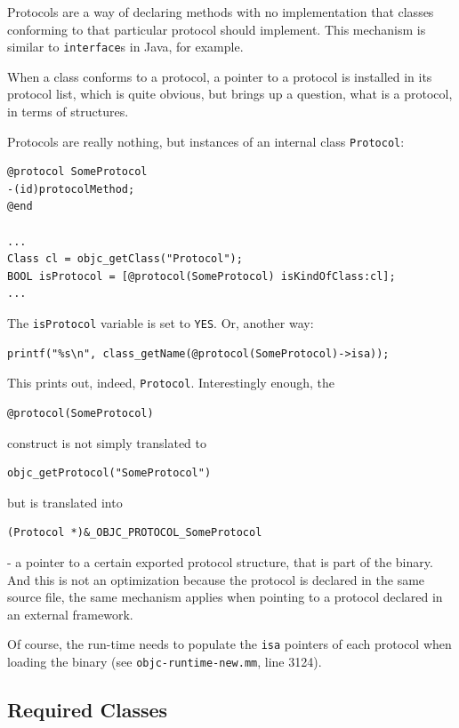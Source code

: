 Protocols are a way of declaring methods with no implementation that classes conforming to that particular protocol should implement. This mechanism is similar to \verb=interface=s in Java, for example.

When a class conforms to a protocol, a pointer to a protocol is installed in its protocol list, which is quite obvious, but brings up a question, what is a protocol, in terms of structures.

Protocols are really nothing, but instances of an internal class \verb=Protocol=:

\begin{verbatim}
@protocol SomeProtocol
-(id)protocolMethod;
@end

...
Class cl = objc_getClass("Protocol");
BOOL isProtocol = [@protocol(SomeProtocol) isKindOfClass:cl];
...
\end{verbatim}

The \verb=isProtocol= variable is set to \verb=YES=. Or, another way:

\begin{verbatim}
printf("%s\n", class_getName(@protocol(SomeProtocol)->isa));
\end{verbatim}

This prints out, indeed, \verb=Protocol=. Interestingly enough, the

\begin{verbatim}@protocol(SomeProtocol)\end{verbatim}
  
construct is not simply translated to

\begin{verbatim}objc_getProtocol("SomeProtocol")\end{verbatim}

but is translated into 

\begin{verbatim}(Protocol *)&_OBJC_PROTOCOL_SomeProtocol\end{verbatim}

- a pointer to a certain exported protocol structure, that is part of the binary. And this is not an optimization because the protocol is declared in the same source file, the same mechanism applies when pointing to a protocol declared in an external framework.

Of course, the run-time needs to populate the \verb=isa= pointers of each protocol when loading the binary (see \verb=objc-runtime-new.mm=, line 3124).

\subsection{Required Classes}

